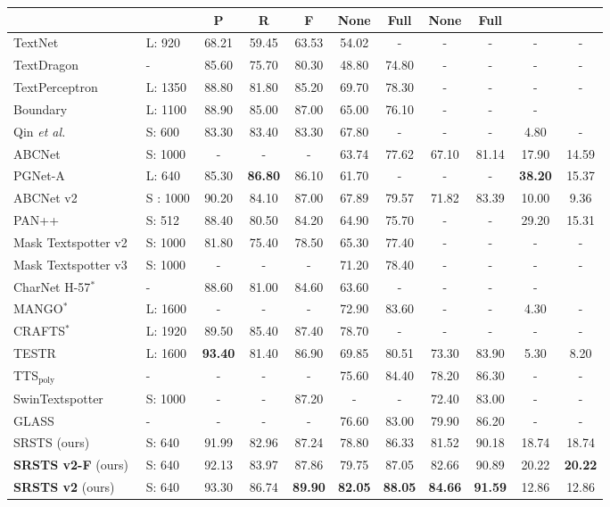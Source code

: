 \begin{table*}[t]
\begin{tabular}{l|l|ccccccc|cc}
& &P&R&F &None& Full &None& Full \\
    \midrule
    TextNet~\cite{sun2018textnet}&L: 920&  68.21& 59.45  &63.53 & 54.02 & -&-&-&-&-\\
    TextDragon~\cite{feng2019textdragon}&-& 85.60 &  75.70&  80.30& 48.80 &74.80&-&-&-&-\\
    TextPerceptron~\cite{qiao2020text}&L: 1350&  88.80&81.80& 85.20& 69.70&78.30&-&-&-&- \\
    Boundary~\cite{wang2020all}&L: 1100& 88.90& 85.00&  87.00& 65.00 &76.10&-&-&-\\
    Qin \textit{et al.}~\cite{wang2020all}&S: 600& 83.30 & 83.40&	83.30& 67.80& -&-&-&4.80&-\\
    ABCNet~\cite{liu2020abcnet}&S: 1000&  -& - & -& 63.74& 77.62& 67.10 &81.14&17.90&14.59 \\
    PGNet-A~\cite{wang2021pgnet} &L: 640 & 85.30&\textbf{86.80}& 86.10 &61.70&- &- &-&\textbf{38.20}& 15.37\\
    ABCNet v2~\cite{liu2021abcnet} &S : 1000&  90.20&84.10& 87.00& 67.89& 79.57& 71.82& 83.39&10.00&9.36\\
    PAN++~\cite{wang2021pan++}&S: 512 & 88.40 & 80.50 &84.20 & 64.90 & 75.70 &- &-&29.20 & 15.31\\
    Mask Textspotter v2~\cite{liao2019mask}&S: 1000& 81.80  &75.40  & 78.50& 65.30& 77.40&-&-&-&-\\ 
    Mask Textspotter v3~\cite{liao2020mask} &S: 1000 & -& -& -&71.20& 78.40&-&-&-&-\\
    CharNet H-57$^{*}$~\cite{xing2019convolutional} & -& 88.60&81.00 &84.60&63.60&-&-&-&-\\
    MANGO$^{*}$~\cite{qiao2020mango} &L: 1600 & -& -&-&72.90 &83.60&-&-&4.30&- \\
    CRAFTS$^{*}$~\cite{baek2020character}&L: 1920 &89.50&85.40 &	87.40&78.70 & -&-&- &-&-\\
TESTR~\cite{zhang2022text} &L: 1600&  \textbf{93.40} & 81.40&  86.90 &69.85& 80.51& 73.30 & 83.90 &5.30&8.20\\
    TTS${}_{\text{poly}}$~\cite{kittenplon2022towards}&-& - &-&-& 75.60 & 84.40& 78.20&  86.30&-&- \\ 
    SwinTextspotter~\cite{huang2022swintextspotter}&S: 1000& - &- & 87.20 &- &- & 72.40 &83.00 & -&-\\
    GLASS~\cite{ronen2022glass} &-&-&-&-&76.60& 83.00&79.90& 86.20&-&-\\ 
    \midrule
    SRSTS (ours)~\cite{wu2022decoupling}& S: 640 &91.99&82.96&87.24&78.80&86.33 &81.52 &90.18&18.74&18.74\\
    \textbf{SRSTS v2-F} (ours) & S: 640& 92.13  &83.97 &87.86&79.75& 87.05 &82.66 &90.89 &20.22 &\textbf{20.22}  \\
    \textbf{SRSTS v2} (ours) &S: 640 & 93.30& 86.74&
\textbf{89.90} &\textbf{82.05}& \textbf{88.05}&\textbf{84.66}&\textbf{91.59} & 12.86& 12.86  \\
    \bottomrule
  \end{tabular}
\end{table*} 
